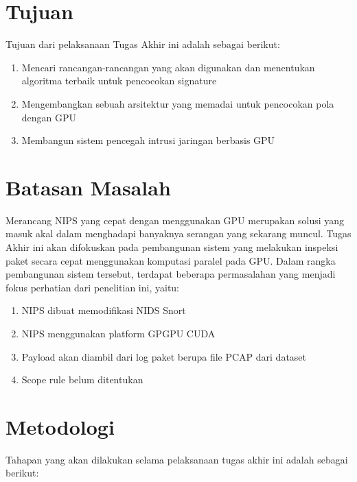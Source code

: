 \section{Tujuan}

  Tujuan dari pelaksanaan Tugas Akhir ini adalah sebagai berikut:

  \begin{enumerate}
      \item Mencari rancangan-rancangan yang akan digunakan dan menentukan algoritma terbaik untuk pencocokan signature
      \item Mengembangkan sebuah arsitektur yang memadai untuk pencocokan pola dengan GPU
      \item Membangun sistem pencegah intrusi jaringan berbasis GPU
  \end{enumerate}

\section{Batasan Masalah}

  Merancang NIPS yang cepat dengan menggunakan GPU merupakan solusi yang masuk akal dalam menghadapi banyaknya serangan yang sekarang muncul. Tugas Akhir ini akan difokuskan pada pembangunan sistem yang melakukan inspeksi paket secara cepat menggunakan komputasi paralel pada GPU. Dalam rangka pembangunan sistem tersebut, terdapat beberapa permasalahan yang menjadi fokus perhatian dari penelitian ini, yaitu:

  \begin{enumerate}
      \item NIPS dibuat memodifikasi NIDS Snort
      \item NIPS menggunakan platform GPGPU CUDA
      \item Payload akan diambil dari log paket berupa file PCAP dari dataset
      \item Scope rule belum ditentukan
  \end{enumerate}

\section{Metodologi}

  Tahapan yang akan dilakukan selama pelaksanaan tugas akhir ini adalah sebagai berikut:

